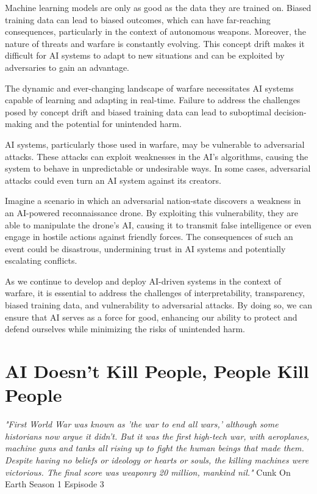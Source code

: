 Machine learning models are only as good as the data they are trained on. Biased training data can lead to biased outcomes, which can have far-reaching consequences, particularly in the context of autonomous weapons. Moreover, the nature of threats and warfare is constantly evolving. This concept drift makes it difficult for AI systems to adapt to new situations and can be exploited by adversaries to gain an advantage.

The dynamic and ever-changing landscape of warfare necessitates AI systems capable of learning and adapting in real-time. Failure to address the challenges posed by concept drift and biased training data can lead to suboptimal decision-making and the potential for unintended harm.

AI systems, particularly those used in warfare, may be vulnerable to adversarial attacks. These attacks can exploit weaknesses in the AI's algorithms, causing the system to behave in unpredictable or undesirable ways. In some cases, adversarial attacks could even turn an AI system against its creators.

Imagine a scenario in which an adversarial nation-state discovers a weakness in an AI-powered reconnaissance drone. By exploiting this vulnerability, they are able to manipulate the drone's AI, causing it to transmit false intelligence or even engage in hostile actions against friendly forces. The consequences of such an event could be disastrous, undermining trust in AI systems and potentially escalating conflicts.

As we continue to develop and deploy AI-driven systems in the context of warfare, it is essential to address the challenges of interpretability, transparency, biased training data, and vulnerability to adversarial attacks. By doing so, we can ensure that AI serves as a force for good, enhancing our ability to protect and defend ourselves while minimizing the risks of unintended harm.

\section{AI Doesn't Kill People, People Kill People}

\textit{"First World War was known as 'the war to end all wars,' although some historians now argue it didn't. But it was the first high-tech war, with aeroplanes, machine guns and tanks all rising up to fight the human beings that made them. Despite having no beliefs or ideology or hearts or souls, the killing machines were victorious. The final score was weaponry 20 million, mankind nil."} Cunk On Earth Season 1 Espisode 3 \cite{cunkonearth}

